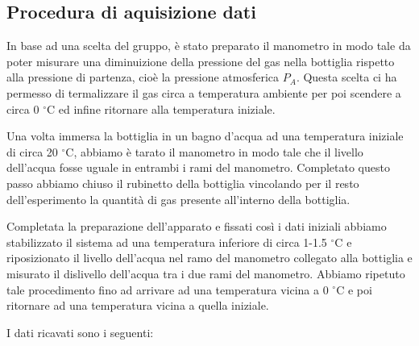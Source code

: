 \subsection{Procedura di aquisizione dati}
In base ad una scelta del gruppo, è stato preparato il manometro in modo tale da poter misurare una diminuizione della pressione del gas nella bottiglia rispetto alla pressione di partenza, cioè la pressione atmosferica $P_A$. Questa scelta ci ha permesso di termalizzare il gas circa a temperatura ambiente per poi scendere a circa 0 $^\circ$C ed infine ritornare alla temperatura iniziale.

Una volta immersa la bottiglia in un bagno d'acqua ad una temperatura iniziale di circa 20 $^\circ$C, abbiamo è tarato il manometro in modo tale che il livello dell'acqua fosse uguale in entrambi i rami del manometro. Completato questo passo abbiamo chiuso il rubinetto della bottiglia vincolando per il resto dell'esperimento la quantità di gas presente all'interno della bottiglia.

Completata la preparazione dell'apparato e fissati così i dati iniziali abbiamo stabilizzato il sistema ad una temperatura inferiore di circa 1-1.5 $^\circ$C e riposizionato il livello dell'acqua nel ramo del manometro collegato alla bottiglia e misurato il dislivello dell'acqua tra i due rami del manometro.
Abbiamo ripetuto tale procedimento fino ad arrivare ad una temperatura vicina a 0 $^\circ$C e poi ritornare ad una temperatura vicina a quella iniziale.

I dati ricavati sono i seguenti:
